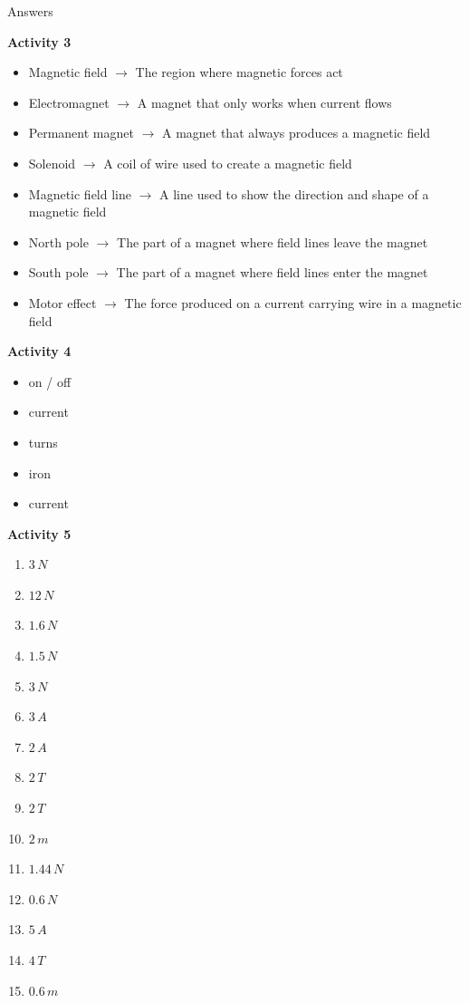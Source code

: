 \documentclass[12pt]{article}
\begin{document}
\newpage

\begin{center}
    {\LARGE Answers}
\end{center}

\vspace{1em}

\textbf{Activity 3}

\begin{itemize}
    \item Magnetic field $\rightarrow$ The region where magnetic forces act
    \item Electromagnet $\rightarrow$ A magnet that only works when current flows
    \item Permanent magnet $\rightarrow$ A magnet that always produces a magnetic field
    \item Solenoid $\rightarrow$ A coil of wire used to create a magnetic field
    \item Magnetic field line $\rightarrow$ A line used to show the direction and shape of a magnetic field
    \item North pole $\rightarrow$ The part of a magnet where field lines leave the magnet
    \item South pole $\rightarrow$ The part of a magnet where field lines enter the magnet
    \item Motor effect $\rightarrow$ The force produced on a current carrying wire in a magnetic field
\end{itemize}

\vspace{1em}

\textbf{Activity 4}

\begin{itemize}
    \item on / off
    \item current
    \item turns
    \item iron
    \item current
\end{itemize}

\vspace{1em}

\textbf{Activity 5}

\begin{enumerate}
    \item \(3\,N\)
    \item \(12\,N\)
    \item \(1.6\,N\)
    \item \(1.5\,N\)
    \item \(3\,N\)
    \item \(3\,A\)
    \item \(2\,A\)
    \item \(2\,T\)
    \item \(2\,T\)
    \item \(2\,m\)
    \item \(1.44\,N\)
    \item \(0.6\,N\)
    \item \(5\,A\)
    \item \(4\,T\)
    \item \(0.6\,m\)
\end{enumerate}
\end{document}
